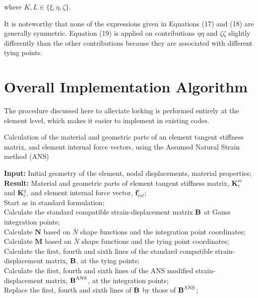 \documentclass[12pt]{article}
\begin{document}
\noindent
where $K,L \in \{\xi,\eta,\zeta \}$.

It is noteworthy that none of the expressions given in Equations (17) and (18) are generally symmetric. Equation (19) is applied on contributions $\eta \eta$ and $\zeta \zeta$ slightly differently than the other contributions because they are associated with different tying points.


\section{Overall Implementation Algorithm}

The procedure discussed here to alleviate locking is performed entirely at the element level, which makes it easier to implement in existing codes.

\begin{algorithm}
\caption{Calculation of the material and geometric parts of an element tangent stiffness matrix, and element internal force vectors, using the Assumed Natural Strain method (ANS)}\label{alg:cap}
\LinesNumbered
\textbf{Input:} Initial geometry of the element, nodal displacements, material properties;\\
\textbf{Result:} Material and geometric parts of element tangent stiffness matrix, $\boldsymbol{K}^m_e$ and $\boldsymbol{K}^g_e$, and element internal force vector, $\boldsymbol{f}_{int}^e$;\\
{
	Start as in standard formulation;\\
	Calculate the standard compatible strain-displacement matrix $\text{\bf{B}}$ at Gauss integration points;\\
	{
	Calculate $\boldsymbol{N}$ based on $\bar{N}$ shape functions and the integration point coordinates;\\
	Calculate $\boldsymbol{M}$ based on $\bar{N}$ shape functions and the tying point coordinates;\\
	Calculate the first, fourth and sixth lines of the standard compatible strain-displacement matrix, $\text{\bf{B}}$, at the tying points;\\


	}
	Calculate the first, fourth and sixth lines of the ANS modified strain-displacement matrix, $\text{\bf{B}}^{\text{ANS}}$, at the integration points;\\
	Replace the first, fourth and sixth lines of $\text{\bf{B}}$ by those of $\text{\bf{B}}^{\text{ANS}}$;\\

}
\end{algorithm}
\end{document}
